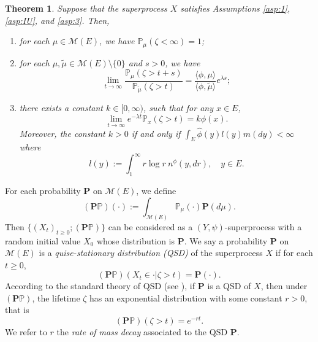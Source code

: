 \documentclass[12pt,a4paper]{amsart}
\numberwithin{equation}{section}
\theoremstyle{plain}
\newtheorem{thm}{Theorem}[section]
\theoremstyle{definition}
\begin{document}
\begin{thm}\label{thm:distribution_of_zeta}
	Suppose that the superprocess $X$ satisfies Assumptions \ref{asp:1},
  \ref{asp:IU}, and \ref{asp:3}. Then,
  \begin{enumerate}
  \item
    \label{subtem:extinct_as_sure}
    for each $\mu \in \mathcal M(E)$, we have  $\mathbb P_\mu(\zeta<\infty)=1$;
  \item
    for each $\mu,\widetilde\mu\in \mathcal M(E)\setminus\{0\}$ and $s>0$, we have
    \[
      \lim_{t\rightarrow\infty}\dfrac{\mathbb P_{\mu}(\zeta>t+s)}{\mathbb P_{\widetilde\mu}(\zeta>t)}=\frac{\langle \phi,\mu\rangle }{\langle \phi,\widetilde\mu\rangle }e^{\lambda s};
    \]
  \item
    there exists a constant $k\in [0,\infty)$, such that for any $x\in E$,
    \begin{equation}\label{eq:decay_rate}
      \lim_{t\rightarrow\infty} e^{-\lambda t}\mathbb P_x(\zeta>t)=k\phi(x).
    \end{equation}
    Moreover, the constant $k>0$ if and only if $\int_E \widehat\phi(y)l(y)m(dy)<\infty$ where
    \begin{equation}\label{eq:m}
      l(y):=\int_1^\infty r\log r~n^\phi(y, dr),\quad y \in E.
    \end{equation}
  \end{enumerate}
\end{thm}

\begin{comment}
In particular, for any $x,y\in E$ and $s\geq 0$, the second result in the above theorem can be written as
\begin{equation}\label{eq:ratio_result}
 	\lim_{t\rightarrow\infty}\frac{\mathbb P_x(\zeta>t+s)}{\mathbb P_y(\zeta>t)}=\frac{\phi(x)}{\phi(y)}e^{\lambda s}.
\end{equation}
So we can see that the effect of the position of the initial mass on the decay of the mass is a ratio of $\phi(\cdot)$ generally.
\end{comment}

For each probability ${\mathbf P}$ on $\mathcal M(E)$, we define
\[
	( {\mathbf P} \mathbb P)(\cdot) := \int_{\mathcal M(E)} \mathbb P_\mu(\cdot) {\mathbf P}(d\mu).
\]
Then $\{(X_t)_{t\geq 0}; ({\mathbf P}\mathbb P)\}$ can be considered as a $(Y,\psi)$-superprocess with a random initial value $X_0$ whose distribution is ${\mathbf P}$.
We say a probability ${\mathbf P}$ on $\mathcal M(E)$ is a \emph{quise-stationary distribution (QSD)} of the superprocess $X$ if  for each $t\geq 0$,
\[
	({\mathbf P}\mathbb P)(X_t \in \cdot | \zeta > t) ={\mathbf P}(\cdot).
\]
According to the standard theory of QSD (see \cite{MeleardVillemonais2012Quasistationary}), if ${\mathbf P}$ is a QSD of $X$, then under $({\mathbf P}\mathbb P)$, the lifetime $\zeta$ has an exponential distribution with some constant $r > 0$, that is
\[
	( {\mathbf P}\mathbb P)(\zeta > t) = e^{-r t}.
\]
We refer to $r$ the \emph{rate of mass decay} associated to the QSD $\mathbf P$.
\end{document}
